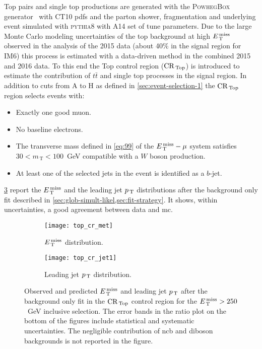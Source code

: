 Top pairs and single top productions are generated with the \textsc{PowhegBox}
generator~\cite{POWHEG} with CT10 \glspl{pdf} and the parton shower,
fragmentation and underlying event simulated with \textsc{pythia8} with A14 set
of tune parameters. Due to the large Monte Carlo modeling uncertainties of the
top background at high $E_\mathrm{\, T}^\mathrm{\, miss}$ observed in the analysis of the 2015 data (about
40\% in the signal region for IM6) this process is estimated with a data-driven
method in the combined 2015 and 2016 data. To this end the Top control region
($\mathrm{CR}_\mathrm{\, Top}$) is introduced to estimate the contribution of $t \bar{t}$ and single
top processes in the signal region. In addition to cuts from A to H as defined
in \cref{sec:event-selection-1} the $\mathrm{CR}_\mathrm{\, Top}$ region selects events with:
\begin{itemize}
\item Exactly one good muon.
\item No baseline electrons.
\item The transverse mass defined in \eqref{eq:99} of the $E_\mathrm{\, T}^\mathrm{\, miss} - \mu$ system
  satisfies $30 < m_\mathrm{\, T} < 100$~GeV compatible with a $W$ boson
  production.
\item At least one of the selected jets in the event is identified as a $b$-jet.
\end{itemize}
\cref{fig:top_plots} report the $E_\mathrm{\, T}^\mathrm{\, miss}$ and the leading jet $p_\mathrm{\, T}$ distributions
after the background only fit described in
\cref{sec:glob-simult-likel,sec:fit-strategy}. It shows, within uncertainties, a
good agreement between data and \gls{mc}.
\begin{figure}[!h]
  \centering
  \begin{subfigure}[t]{.48\linewidth}
    \texttt{[image: top\_cr\_met]}
    \caption{$E_\mathrm{\, T}^\mathrm{\, miss}$ distribution.}
    \label{fig:top_cr_et_miss}
  \end{subfigure}
  \begin{subfigure}[t]{.48\linewidth}
    \texttt{[image: top\_cr\_jet1]}
    \caption{Leading jet $p_\mathrm{\, T}$ distribution.}
    \label{fig:top_cr_jet1}
  \end{subfigure}
  \caption{Observed and predicted $E_\mathrm{\, T}^\mathrm{\, miss}$ and leading jet $p_\mathrm{\, T}$ after the
    background only fit in the $\mathrm{CR}_\mathrm{\, Top}$ control region for the $E_\mathrm{\, T}^\mathrm{\, miss} > 250$~GeV
    inclusive selection. The error bands in the ratio plot on the bottom of the
    figures include statistical and systematic uncertainties. The negligible
    contribution of \gls{ncb} and diboson backgrounds is not reported in the
    figure.}
  \label{fig:top_plots}
\end{figure}
